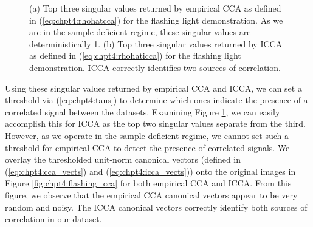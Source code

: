 \begin{figure}
  \begin{center}
    \caption{(a) Top three singular values returned by empirical CCA as defined in
      (\ref{eq:chpt4:rhohatcca}) for the flashing light demonstration. As we are in the
      sample deficient regime, these singular values are deterministically 1. (b) Top
      three singular values returned by ICCA as defined in (\ref{eq:chpt4:rhohaticca}) for
      the flashing light demonstration. ICCA correctly identifies two sources of
      correlation.}
    \label{fig:chpt4:flashing_corrs}
  \end{center}
\end{figure}

Using these singular values returned by empirical CCA and ICCA, we can set a threshold via
(\ref{eq:chpt4:taus}) to determine which ones indicate the presence of a correlated signal
between the datasets. Examining Figure \ref{fig:chpt4:flashing_corrs}, we can easily
accomplish this for ICCA as the top two singular values separate from the third. However,
as we operate in the sample deficient regime, we cannot set such a threshold for empirical
CCA to detect the presence of correlated signals. We overlay the thresholded unit-norm
canonical vectors (defined in (\ref{eq:chpt4:cca_vects}) and (\ref{eq:chpt4:icca_vects})) onto
the original images in Figure \ref{fig:chpt4:flashing_cca} for both empirical CCA and
ICCA. From this figure, we observe that the empirical CCA canonical vectors appear to be
very random and noisy. The ICCA canonical vectors correctly identify both sources of
correlation in our dataset.

